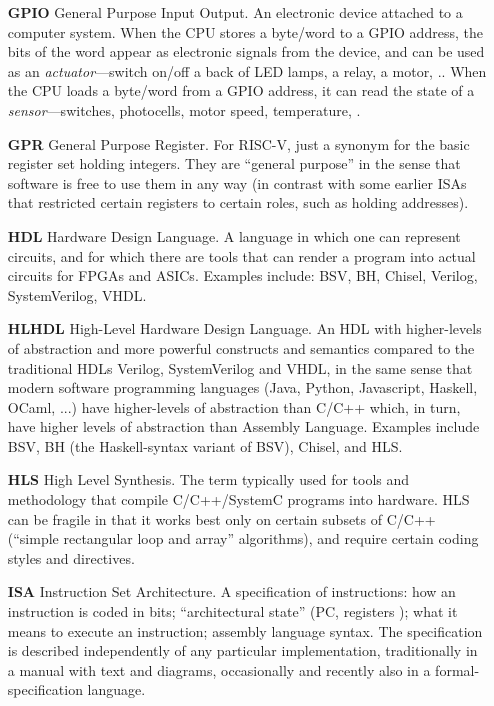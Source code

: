 \begin{itemize}
\item[\bf GPIO] General Purpose Input Output.  An electronic device
  attached to a computer system. When the CPU stores a byte/word to a
  GPIO address, the bits of the word appear as electronic signals from
  the device, and can be used as an \emph{actuator}---switch on/off a
  back of LED lamps, a relay, a motor, {\etc.}.  When the CPU loads a
  byte/word from a GPIO address, it can read the state of a
  \emph{sensor}---switches, photocells, motor speed, temperature,
  {\etc.}

\item[\bf GPR] General Purpose Register.  For RISC-V, just a synonym
  for the basic register set holding integers.  They are ``general
  purpose'' in the sense that software is free to use them in any way
  (in contrast with some earlier ISAs that restricted certain
  registers to certain roles, such as holding addresses).

\item[\bf HDL] Hardware Design Language.  A language in which one can
  represent circuits, and for which there are tools that can render a
  program into actual circuits for FPGAs and ASICs.  Examples include:
  BSV, BH, Chisel, Verilog, SystemVerilog, VHDL.

\item[\bf HLHDL] High-Level Hardware Design Language.  An HDL with
  higher-levels of abstraction and more powerful constructs and
  semantics compared to the traditional HDLs Verilog, SystemVerilog
  and VHDL, in the same sense that modern software programming
  languages (Java, Python, Javascript, Haskell, OCaml, ...) have
  higher-levels of abstraction than C/C++ which, in turn, have higher
  levels of abstraction than Assembly Language.  Examples include BSV,
  BH (the Haskell-syntax variant of BSV), Chisel, and HLS.

\item[\bf HLS] High Level Synthesis.  The term typically used for
  tools and methodology that compile C/C++/SystemC programs into
  hardware.  HLS can be fragile in that it works best only on certain
  subsets of C/C++ (``simple rectangular loop and array'' algorithms),
  and require certain coding styles and directives.

\item[\bf ISA] Instruction Set Architecture.  A specification of
  instructions: how an instruction is coded in bits; ``architectural
  state'' (PC, registers {\etc}); what it means to execute an
  instruction; assembly language syntax.  The specification is
  described independently of any particular implementation,
  traditionally in a manual with text and diagrams, occasionally and
  recently also in a formal-specification language.


\end{itemize}

